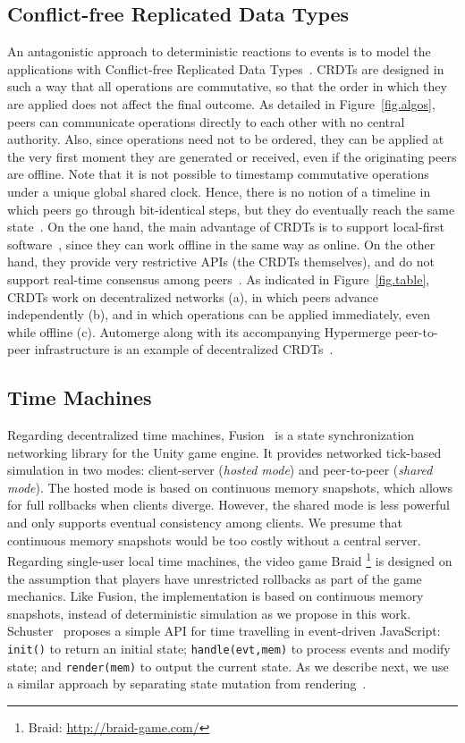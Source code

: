 \documentclass[10pt,journal,compsoc]{IEEEtran}
\newcommand{\code}[1]  {\texttt{\small{#1}}}
\begin{document}
\subsection{Conflict-free Replicated Data Types}

An antagonistic approach to deterministic reactions to events is to model the
applications with Conflict-free Replicated Data Types~\cite{crdts}.
CRDTs are designed in such a way that all operations are commutative, so that
the order in which they are applied does not affect the final outcome.
%
As detailed in Figure~\ref{fig.algos}, peers can communicate operations
directly to each other with no central authority.
Also, since operations need not to be ordered, they can be applied at the
very first moment they are generated or received, even if the originating peers
are offline.
%
Note that it is not possible to timestamp commutative operations under a unique
global shared clock.
Hence, there is no notion of a timeline in which peers go through bit-identical
steps, but they do eventually reach the same state~\cite{crdts.eventual}.
%
On the one hand, the main advantage of CRDTs is to support local-first
software~\cite{local}, since they can work offline in the same way as online.
On the other hand, they provide very restrictive APIs (the CRDTs themselves),
and do not support real-time consensus among peers~\cite{crdts.consensus}.
%
As indicated in Figure~\ref{fig.table}, CRDTs work on decentralized networks
(a), in which peers advance independently (b), and in which operations can be
applied immediately, even while offline (c).
%
Automerge along with its accompanying Hypermerge peer-to-peer infrastructure
is an example of decentralized CRDTs~\cite{p2p.automerge,p2p.pushpin}.

\subsection{Time Machines}

Regarding decentralized time machines, Fusion~\cite{fusion} is a state
synchronization networking library for the Unity game engine.
It provides networked tick-based simulation in two modes: client-server
(\emph{hosted mode}) and peer-to-peer (\emph{shared mode}).
The hosted mode is based on continuous memory snapshots, which allows for
full rollbacks when clients diverge.
However, the shared mode is less powerful and only supports eventual
consistency among clients.
We presume that continuous memory snapshots would be too costly without a
central server.
%
Regarding single-user local time machines, the video game Braid%
\footnote{Braid: \url{http://braid-game.com/}}
is designed on the assumption that players have unrestricted rollbacks as part
of the game mechanics.
Like Fusion, the implementation is based on continuous memory snapshots,
instead of deterministic simulation as we propose in this work.
%
Schuster~\cite{tml.js} proposes a simple API for time travelling in
event-driven JavaScript:
    \code{init()} to return an initial state;
    \code{handle(evt,mem)} to process events and modify state; and
    \code{render(mem)} to output the current state.
As we describe next, we use a similar approach by separating state mutation
from rendering~\cite{tml.alive}.
\end{document}
